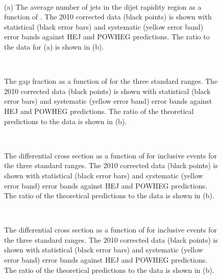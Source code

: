 \begin{figure}
\centering
\mbox{
              \quad
              \quad
                              }
\caption[]{
(a) The average number of jets in the dijet rapidity region as a function of \dy{}.  
The 2010 corrected data (black points) is shown with statistical (black error bars) and systematic (yellow error band) error bands against HEJ and POWHEG predictions.
The ratio to the data for (a) is shown in (b). 
\label{GBJ2:FinalPlots:nJets}}
\end{figure}

\begin{figure}
\centering
\mbox{
              \quad
              \quad
                              }
\caption[]{
The gap fraction as a function of \qz{} for the three standard \dy{} ranges.  
The 2010 corrected data (black points) is shown with statistical (black error bars) and systematic (yellow error band) error bands against HEJ and POWHEG predictions.
The ratio of the theoretical predictions to the data is shown in (b).
\label{GBJ2:FinalPlots:Q0}}
\end{figure}

\begin{figure}
\centering
\mbox{
              \quad
              \quad
                              }
\caption[]{
The differential cross section as a function of \dphi{} for inclusive events for the three standard \dy{} ranges.  
The 2010 corrected data (black points) is shown with statistical (black error bars) and systematic (yellow error band) error bands against HEJ and POWHEG predictions.
The ratio of the theoretical predictions to the data is shown in (b).
\label{GBJ2:FinalPlots:dPhi_Incl}}
\end{figure}

\begin{figure}
\centering
\mbox{
              \quad
              \quad
                              }
\caption[]{
The differential cross section as a function of \dphi{} for inclusive events for the three standard \dy{} ranges.  
The 2010 corrected data (black points) is shown with statistical (black error bars) and systematic (yellow error band) error bands against HEJ and POWHEG predictions.
The ratio of the theoretical predictions to the data is shown in (b).
\label{GBJ2:FinalPlots:dPhi_Gap}}
\end{figure}


